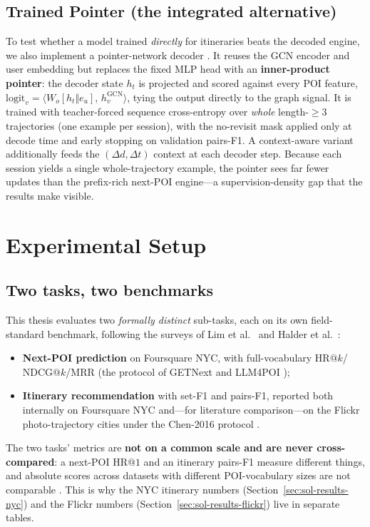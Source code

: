 \subsection{Trained Pointer (the integrated alternative)}
\label{sec:sol-decoding-pointer}

To test whether a model trained \emph{directly} for itineraries beats the decoded engine, we
also implement a pointer-network decoder \cite{vinyals2015pointer}. It reuses the GCN encoder
and user embedding but replaces the fixed MLP head with an \textbf{inner-product pointer}:
the decoder state $h_t$ is projected and scored against every POI feature,
$\mathrm{logit}_v=\langle W_o[h_t\Vert e_u],\,h_v^{\mathrm{GCN}}\rangle$, tying the output
directly to the graph signal. It is trained with teacher-forced sequence cross-entropy over
\emph{whole} length-$\ge\!3$ trajectories (one example per session), with the no-revisit mask
applied only at decode time and early stopping on validation pairs-F1. A context-aware variant
additionally feeds the $(\Delta d,\Delta t)$ context at each decoder step. Because each session
yields a single whole-trajectory example, the pointer sees far fewer updates than the
prefix-rich next-POI engine---a supervision-density gap that the results make visible.

\section{Experimental Setup}
\label{sec:sol-experiments}

\subsection{Two tasks, two benchmarks}
\label{sec:sol-exp-tasks}

This thesis evaluates two \emph{formally distinct} sub-tasks, each on its own field-standard
benchmark, following the surveys of Lim et al.~\cite{lim2018survey} and
Halder et al.~\cite{halder2024survey}:
\begin{itemize}[leftmargin=*]
  \item \textbf{Next-POI prediction} on Foursquare NYC, with full-vocabulary
        $\mathrm{HR@}k$/$\mathrm{NDCG@}k$/$\mathrm{MRR}$ (the protocol of GETNext
        \cite{yang2022getnext} and LLM4POI \cite{li2024llm4poi});
  \item \textbf{Itinerary recommendation} with set-F1 and pairs-F1, reported both internally on
        Foursquare NYC and---for literature comparison---on the Flickr photo-trajectory cities
        under the Chen-2016 protocol \cite{chen2016learning}.
\end{itemize}
The two tasks' metrics are \textbf{not on a common scale and are never cross-compared}: a
next-POI $\mathrm{HR@}1$ and an itinerary pairs-F1 measure different things, and absolute scores
across datasets with different POI-vocabulary sizes are not comparable
\cite{krichene2020sampled}. This is why the NYC itinerary numbers (Section~\ref{sec:sol-results-nyc})
and the Flickr numbers (Section~\ref{sec:sol-results-flickr}) live in separate tables.

